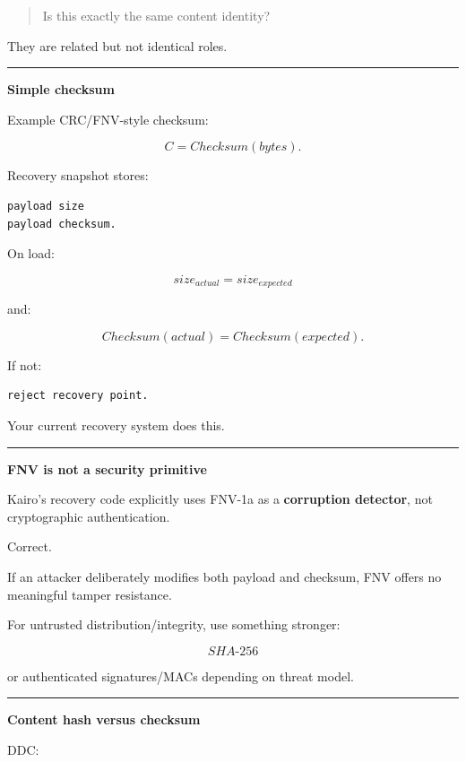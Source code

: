 \begin{quote}
Is this exactly the same content identity?
\end{quote}

They are related but not identical roles.

\begin{center}\rule{0.5\linewidth}{0.5pt}\end{center}

\textbf{Simple checksum}

Example CRC/FNV-style checksum:

\[
C=Checksum(bytes).
\]

Recovery snapshot stores:

\begin{verbatim}
payload size
payload checksum.
\end{verbatim}

On load:

\[
size_{actual}=size_{expected}
\]

and:

\[
Checksum(actual)=Checksum(expected).
\]

If not:

\begin{verbatim}
reject recovery point.
\end{verbatim}

Your current recovery system does this.

\begin{center}\rule{0.5\linewidth}{0.5pt}\end{center}

\textbf{FNV is not a security primitive}

Kairo's recovery code explicitly uses FNV-1a as a \textbf{corruption detector}, not cryptographic authentication.

Correct.

If an attacker deliberately modifies both payload and checksum, FNV offers no meaningful tamper resistance.

For untrusted distribution/integrity, use something stronger:

\[
SHA\text{-}256
\]

or authenticated signatures/MACs depending on threat model.

\begin{center}\rule{0.5\linewidth}{0.5pt}\end{center}

\textbf{Content hash versus checksum}

DDC:

